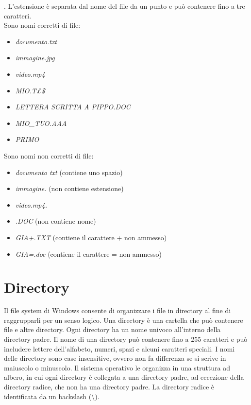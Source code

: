 \documentclass[12pt]{report}
\begin{document}
	. L'estensione è separata dal nome del file da un punto e può contenere fino a tre caratteri.
	\vspace{\baselineskip}\\
	Sono nomi corretti di file:
	\begin{itemize}
		\item \textit{documento.txt}
		\item \textit{immagine.jpg}
		\item \textit{video.mp4}
		\item \textit{MIO.T£\$}
		\item \textit{LETTERA SCRITTA A PIPPO.DOC}
		\item \textit{MIO\_TUO.AAA}
		\item \textit{PRIMO}
	\end{itemize}
	Sono nomi non corretti di file:
	\begin{itemize}
		\item \textit{documento txt} (contiene uno spazio)
		\item \textit{immagine.} (non contiene estensione)
		\item \textit{video.mp4.}
		\item \textit{.DOC} (non contiene nome)
		\item \textit{GIA+.TXT} (contiene il carattere + non ammesso)
		\item \textit{GIA=.doc} (contiene il carattere = non ammesso)
	\end{itemize}

	\section{Directory}
	Il file system di Windows consente di organizzare i file in directory al fine di raggrupparli per un senso logico. Una directory è una cartella che può contenere file e altre directory. Ogni directory ha un nome univoco all'interno della directory padre. Il nome di una directory può contenere fino a 255 caratteri e può includere lettere dell'alfabeto, numeri, spazi e alcuni caratteri speciali. I nomi delle directory sono case insensitive, ovvero non fa differenza se si scrive in maiuscolo o minuscolo. Il sistema operativo le organizza in una struttura ad albero, in cui ogni directory è collegata a una directory padre, ad eccezione della directory radice, che non ha una directory padre. La directory radice è identificata da un backslash (\textbackslash).
\end{document}
